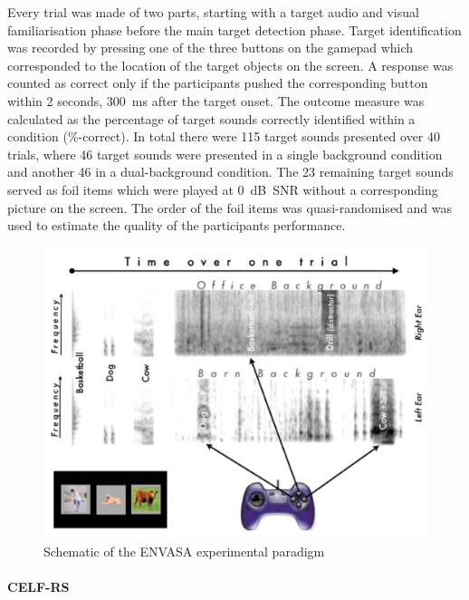 \documentclass[a4paper, twoside]{templates/ociamthesis}
\begin{document}
Every trial was made of two parts, starting with a target audio and visual familiarisation phase before the main target detection phase. Target identification was recorded by pressing one of the three buttons on the gamepad which corresponded to the location of the target objects on the screen. A response was counted as correct only if the participants pushed the corresponding button within 2 seconds, 300~ms after the target onset. The outcome measure was calculated as the percentage of target sounds correctly identified within a condition (\%-correct). In total there were 115 target sounds presented over 40 trials, where 46 target sounds were presented in a single background condition and another 46 in a dual-background condition. The 23 remaining target sounds served as foil items which were played at 0~dB~SNR without a corresponding picture on the screen. The order of the foil items was quasi-randomised and was used to estimate the quality of the participants performance.\\



\begin{figure}

{\centering \includegraphics[width=0.65\linewidth]{figures/ENVASAparadigm} 

}

\caption{Schematic of the ENVASA experimental paradigm \autocite[taken from][]{Leech2009}}\label{fig:ENVASA}
\end{figure}

\hypertarget{celf-rs}{%
\paragraph{CELF-RS}\label{celf-rs}}
\end{document}
